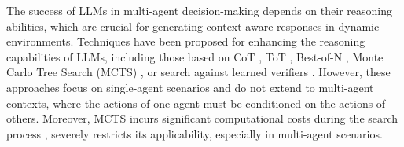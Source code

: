 The success of LLMs in multi-agent decision-making depends on their reasoning abilities, which are crucial for generating context-aware responses in dynamic environments. Techniques have been proposed for enhancing the reasoning capabilities of LLMs, including those based on CoT \cite{wei2022chain}, ToT \cite{yao2024tree}, Best-of-N \cite{lightman2023let, wang2023math}, Monte Carlo Tree Search (MCTS) \cite{gao2024interpretable, zhang2024rest, wang2023math, wang2024towards}, or search against learned verifiers \cite{cobbe2021training}. However, these approaches focus on single-agent scenarios and do not extend to multi-agent contexts, where the actions of one agent must be conditioned on the actions of others. Moreover, MCTS incurs significant computational costs during the search process \cite{wang2024q,ye2022spending}, severely restricts its applicability, especially in multi-agent scenarios. 



%